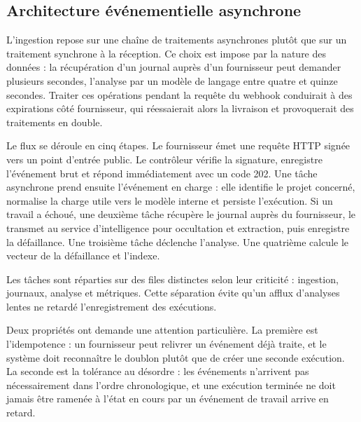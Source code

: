 \documentclass[12pt,a4paper,oneside]{report}
\begin{document}
\subsection{Architecture événementielle asynchrone}

L'ingestion repose sur une chaîne de traitements asynchrones plutôt que sur un
traitement synchrone à la réception. Ce choix est impose par la nature des
données : la récupération d'un journal auprès d'un fournisseur peut demander
plusieurs secondes, l'analyse par un modèle de langage entre quatre et quinze
secondes. Traiter ces opérations pendant la requête du webhook conduirait à des
expirations côté fournisseur, qui réessaierait alors la livraison et provoquerait
des traitements en double.

Le flux se déroule en cinq étapes. Le fournisseur émet une requête HTTP signée
vers un point d'entrée public. Le contrôleur vérifie la signature, enregistre
l'événement brut et répond immédiatement avec un code 202. Une tâche asynchrone
prend ensuite l'événement en charge : elle identifie le projet concerné,
normalise la charge utile vers le modèle interne et persiste l'exécution. Si un
travail a échoué, une deuxième tâche récupère le journal auprès du fournisseur,
le transmet au service d'intelligence pour occultation et extraction, puis
enregistre la défaillance. Une troisième tâche déclenche l'analyse. Une quatrième
calcule le vecteur de la défaillance et l'indexe.

Les tâches sont réparties sur des files distinctes selon leur criticité :
ingestion, journaux, analyse et métriques. Cette séparation évite qu'un afflux
d'analyses lentes ne retardé l'enregistrement des exécutions.

Deux propriétés ont demande une attention particulière. La première est
l'idempotence : un fournisseur peut relivrer un événement déjà traite, et le
système doit reconnaître le doublon plutôt que de créer une seconde exécution. La
seconde est la tolérance au désordre : les événements n'arrivent pas
nécessairement dans l'ordre chronologique, et une exécution terminée ne doit
jamais être ramenée à l'état en cours par un événement de travail arrive en
retard.
\end{document}
